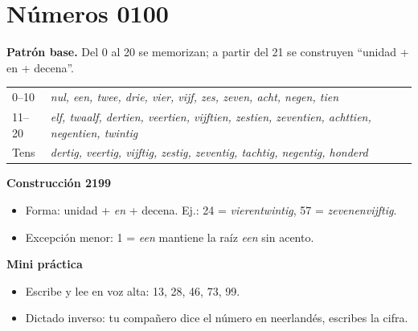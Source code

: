 \section{Números 0\textendash{}100}
\textbf{Patrón base.} Del 0 al 20 se memorizan; a partir del 21 se construyen ``unidad + en + decena''.

\begin{tabular}{@{}lll@{}}
\toprule
0--10 & \textit{nul, een, twee, drie, vier, vijf, zes, zeven, acht, negen, tien} &  \\
11--20 & \textit{elf, twaalf, dertien, veertien, vijftien, zestien, zeventien, achttien, negentien, twintig} &  \\
Tens & \textit{dertig, veertig, vijftig, zestig, zeventig, tachtig, negentig, honderd} &  \\
\bottomrule
\end{tabular}

\textbf{Construcción 21\textendash{}99}
\begin{itemize}[leftmargin=*]
  \item Forma: unidad + \textit{en} + decena. Ej.: 24 = \textit{vierentwintig}, 57 = \textit{zevenenvijftig}.
  \item Excepción menor: 1 = \textit{een} mantiene la raíz \textit{een} sin acento.
\end{itemize}

\textbf{Mini práctica}
\begin{itemize}[leftmargin=*]
  \item Escribe y lee en voz alta: 13, 28, 46, 73, 99.
  \item Dictado inverso: tu compañero dice el número en neerlandés, escribes la cifra.
\end{itemize}
